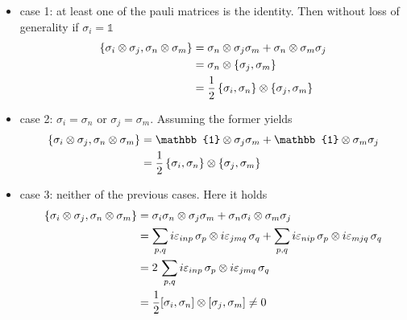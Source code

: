 \begin{itemize}
    \item case 1: at least one of the pauli matrices is the identity. Then without loss of generality if $\sigma_i=\mathbb{1}$
    \begin{align*}
        \{\sigma_i\otimes\sigma_j,\sigma_n\otimes\sigma_m\}&=\sigma_n\otimes\sigma_j\sigma_m+\sigma_n\otimes\sigma_m\sigma_j\\
        &=\sigma_n\otimes\{\sigma_j,\sigma_m\}\\
        &=\frac{1}{2}\,\{\sigma_i,\sigma_n\}\otimes\{\sigma_j,\sigma_m\}
    \end{align*}
    \item case 2: $\sigma_i=\sigma_n$ or $\sigma_j=\sigma_m$. Assuming the former yields
    \begin{align*}
        \{\sigma_i\otimes\sigma_j,\sigma_n\otimes\sigma_m\}&=\mathbb{1}\otimes\sigma_j\sigma_m+\mathbb{1}\otimes\sigma_m\sigma_j\\
        &=\half\,\{\sigma_i,\sigma_n\}\otimes\{\sigma_j,\sigma_m\}
    \end{align*}
    \item case 3: neither of the previous cases. Here it holds
    \begin{align*}
        \{\sigma_i\otimes\sigma_j,\sigma_n\otimes\sigma_m\}&=\sigma_i\sigma_n\otimes\sigma_j\sigma_m+\sigma_n\sigma_i\otimes\sigma_m\sigma_j\\
        &=\sum_{p,q} i\varepsilon_{inp}\,\sigma_p\otimes i\varepsilon_{jmq}\,\sigma_q+\sum_{p,q} i\varepsilon_{nip}\,\sigma_p\otimes i\varepsilon_{mjq}\,\sigma_q\\
        &=2\,\sum_{p,q} i\varepsilon_{inp}\,\sigma_p\otimes i\varepsilon_{jmq}\,\sigma_q\\
        &=\frac{1}{2}[\sigma_i,\sigma_n]\otimes[\sigma_j,\sigma_m]\neq0
    \end{align*}
\end{itemize}